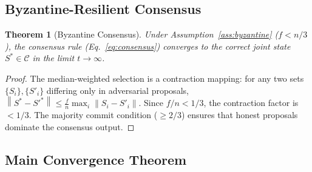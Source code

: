 \documentclass[11pt,letterpaper]{article}
\newtheorem{theorem}{Theorem}[section]
\newcommand{\cC}{\mathcal{C}}
\newcommand{\norm}[1]{\left\lVert#1\right\rVert}
\begin{document}
\subsection{Byzantine-Resilient Consensus}

\begin{theorem}[Byzantine Consensus]
\label{thm:byzantine}
Under Assumption~\ref{ass:byzantine} ($f < n/3$), the consensus rule
(Eq.~\eqref{eq:consensus}) converges to the correct joint state
$S^* \in \cC$ in the limit $t \to \infty$.
\end{theorem}
\begin{proof}
The median-weighted selection is a contraction mapping: for any two
sets $\{S_i\}, \{S'_i\}$ differing only in adversarial proposals,
$\norm{S^* - S'^*} \leq \frac{f}{n} \max_i \norm{S_i - S'_i}$.
Since $f/n < 1/3$, the contraction factor is $< 1/3$.
The majority commit condition ($\geq 2/3$) ensures that honest
proposals dominate the consensus output.
\end{proof}

\subsection{Main Convergence Theorem}
\end{document}
